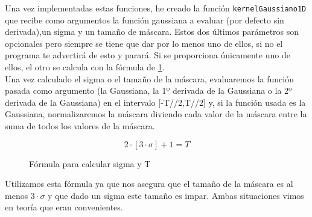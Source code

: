 \documentclass[12pt,spanish]{article}
\begin{document}
Una vez implementadas estas funciones, he creado la función \texttt{kernelGaussiano1D} que recibe como argumentos la función gaussiana a evaluar (por defecto sin derivada),un sigma y un tamaño de máscara. Estos dos últimos parámetros son opcionales pero siempre se tiene que dar por lo menos uno de ellos, si no el programa te advertirá de esto y parará. Si se proporciona únicamente uno de ellos, el otro se calcula con la fórmula de \ref{f_sigma_tam}. \\

Una vez calculado el sigma o el tamaño de la máscara, evaluaremos la función pasada como argumento (la Gaussiana, la 1º derivada de la Gaussiana o la 2º derivada de la Gaussiana) en el intervalo [-T//2,T//2] y, si la función usada es la Gaussiana, normalizaremos la máscara diviendo cada valor de la máscara entre la suma de todos los valores de la máscara.

\begin{figure}[H]
	\centering
	\[ 2 \cdot [3 \cdot \sigma] + 1 = T \]
	\caption{Fórmula para calcular sigma y T}
	\label{f_sigma_tam}
\end{figure}

Utilizamos esta fórmula ya que nos asegura que el tamaño de la máscara es al menos $3 \cdot \sigma$ y que dado un sigma este tamaño es impar. Ambas situaciones vimos en teoría que eran convenientes.
\end{document}
